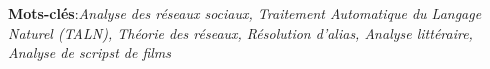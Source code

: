 \documentclass[a4paper, 12pt]{report}
\begin{document}
\textbf{Mots-clés}:\textit{Analyse des réseaux sociaux, Traitement Automatique du Langage Naturel (TALN), Théorie des réseaux, Résolution d'alias, Analyse littéraire, Analyse de scripst de films}



%
\end{document}
